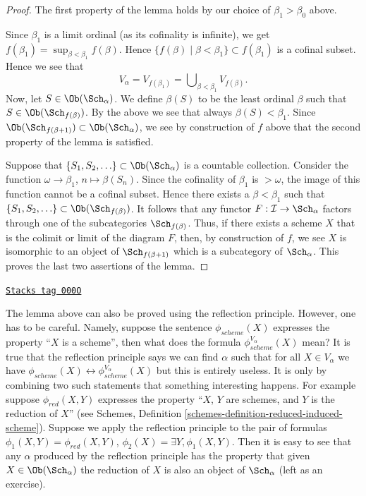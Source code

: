 \begin{proof}
\medskip\noindent
The first property of the lemma holds by our choice
of $\beta_1 > \beta_0$ above.

\medskip\noindent
Since $\beta_1$ is a limit ordinal (as its cofinality is infinite),
we get $f(\beta_1) = \sup_{\beta < \beta_1} f(\beta)$.
Hence $\{f(\beta) \mid \beta < \beta_1\} \subset f(\beta_1)$ is a
cofinal subset. Hence we see that
$$
V_\alpha = V_{f(\beta_1)} = \bigcup\nolimits_{\beta < \beta_1} V_{f(\beta)}.
$$
Now, let $S \in \Ob(\Sch_\alpha)$. We define
$\beta(S)$ to be the least ordinal $\beta$ such that
$S \in \Ob(\Sch_{f(\beta)})$. By the above we see
that always $\beta(S) < \beta_1$. Since
$\Ob(\Sch_{f(\beta + 1)}) \subset
\Ob(\Sch_\alpha)$, we
see by construction of $f$ above that the second property of the lemma
is satisfied.

\medskip\noindent
Suppose that $\{S_1, S_2, \ldots\} \subset \Ob(\Sch_\alpha)$
is a countable collection. Consider the function
$\omega \to \beta_1$, $n \mapsto \beta(S_n)$. Since the cofinality
of $\beta_1$ is $> \omega$, the image of this function cannot be a
cofinal subset. Hence there exists a $\beta < \beta_1$ such
that $\{S_1, S_2, \ldots\} \subset \Ob(\Sch_{f(\beta)})$.
It follows that any functor $F : \mathcal{I} \to \Sch_\alpha$
factors through one of the subcategories $\Sch_{f(\beta)}$.
Thus, if there exists a scheme $X$ that is the colimit or limit
of the diagram $F$, then, by construction of $f$, we see
$X$ is isomorphic to an object
of $\Sch_{f(\beta + 1)}$ which is a subcategory of
$\Sch_\alpha$. This proves the last two assertions of
the lemma.
\end{proof}

\begin{remark}
\label{sets-remark-how-to-use-reflection}
\href{https://stacks.math.columbia.edu/tag/000O}{\texttt{Stacks tag 000O}}

The lemma above can also be proved using the reflection principle.
However, one has to be careful. Namely, suppose the sentence
$\phi_{scheme}(X)$ expresses the property ``$X$ is a scheme'', then
what does the formula $\phi_{scheme}^{V_\alpha}(X)$ mean?
It is true that the reflection principle says we can find $\alpha$ such that
for all $X \in V_\alpha$ we have
$\phi_{scheme}(X) \leftrightarrow \phi_{scheme}^{V_\alpha}(X)$
but this is entirely useless. It is only by combining two such
statements that something interesting happens. For example suppose
$\phi_{red}(X, Y)$ expresses the property ``$X$, $Y$ are schemes,
and $Y$ is the reduction of $X$'' (see
Schemes, Definition \ref{schemes-definition-reduced-induced-scheme}).
Suppose we apply the reflection principle to the pair of
formulas $\phi_1(X, Y) = \phi_{red}(X, Y)$,
$\phi_2(X) = \exists Y, \phi_1(X, Y)$. Then it is easy to see that
any $\alpha$ produced by the reflection principle has the property that
given $X \in \Ob(\Sch_\alpha)$ the reduction of
$X$ is also an object of $\Sch_\alpha$ (left as an exercise).
\end{remark}

